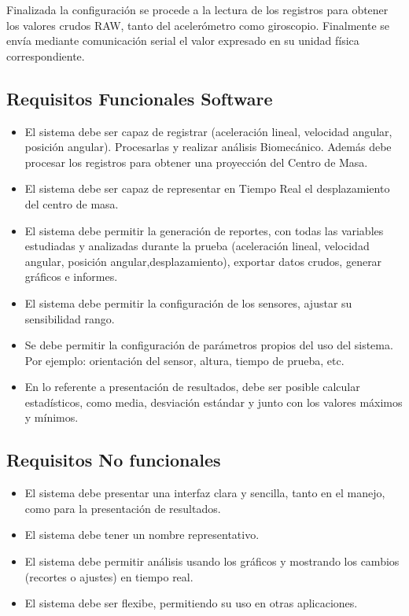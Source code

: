 \documentclass[12pt,a4paper]{article}
\begin{document}
Finalizada la configuración se procede a la lectura de los registros para obtener los valores crudos RAW, tanto del acelerómetro como giroscopio. Finalmente se envía mediante comunicación serial el valor expresado en su unidad física correspondiente.

\subsection{Requisitos Funcionales Software}
\begin{itemize}
	\item El sistema debe ser capaz de registrar (aceleración lineal, velocidad angular, posición angular). Procesarlas y realizar análisis Biomecánico. Además debe procesar los registros para obtener una proyección del Centro de Masa.
	\item El sistema debe ser capaz de representar en Tiempo Real el desplazamiento del centro de masa.
	\item El sistema debe permitir la generación de reportes, con todas las variables estudiadas y analizadas durante la prueba (aceleración lineal, velocidad angular, posición angular,desplazamiento), exportar datos crudos, generar gráficos e informes.
	\item El sistema debe permitir la configuración de los sensores, ajustar su sensibilidad rango.
	\item Se debe permitir la configuración de parámetros propios del uso del sistema. Por ejemplo: orientación del sensor, altura, tiempo de prueba, etc.
	\item En lo referente a presentación de resultados, debe ser posible calcular estadísticos, como media, desviación estándar y junto con los valores máximos y mínimos.
\end{itemize} 

\subsection{Requisitos No funcionales}
\begin{itemize}
	\item El sistema debe presentar una interfaz clara y sencilla, tanto en el manejo, como para la presentación de resultados.
	\item El sistema debe tener un nombre representativo.
	\item El sistema debe permitir análisis usando los gráficos y mostrando los cambios (recortes o ajustes) en tiempo real.
	\item El sistema debe ser flexibe, permitiendo su uso en otras aplicaciones.
\end{itemize}
\end{document}
